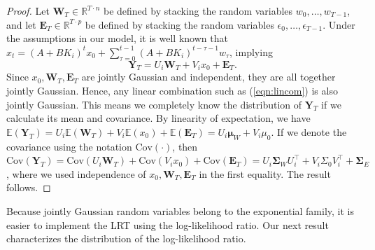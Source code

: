 \documentclass[letterpaper, 10 pt, conference]{ieeeconf}  %
\begin{document}
\begin{proof}
    Let $\mathbf{W}_T \in \mathbb{R}^{T\cdot n}$ be defined by stacking the random variables $w_0,\ldots,w_{T-1}$, and let $\mathbf{E}_T \in \mathbb{R}^{T\cdot p}$ be defined by stacking the random variables $\epsilon_0,\ldots,\epsilon_{T-1}$. Under the assumptions in our model, it is well known that $x_{t} = (A+BK_i)^tx_0 + \sum_{\tau = 0}^{t-1}(A+BK_i)^{t-\tau-1}w_\tau$, implying
    \begin{equation}
        \mathbf{Y}_T = U_i\mathbf{W}_T + V_ix_0 + \mathbf{E}_T.\label{eqn:lincom}
    \end{equation} 
    Since $x_0, \mathbf{W}_T, \mathbf{E}_T$ are jointly Gaussian and independent, they are all together jointly Gaussian. Hence, any linear combination such as (\ref{eqn:lincom}) is also jointly Gaussian. This means we completely know the distribution of $\mathbf{Y}_T$ if we calculate its mean and covariance. By linearity of expectation, we have $\mathbb{E}(\mathbf{Y}_T) = U_i\mathbb{E}(\mathbf{W}_T) + V_i\mathbb{E}(x_0) + \mathbb{E}(\mathbf{E}_T) = 
        U_i\boldsymbol{\mu}_W + V_i\mu_0$. If we denote the covariance using the notation $\textrm{Cov}(\cdot)$, then $\textrm{Cov}(\mathbf{Y}_T) = \textrm{Cov}(U_i\mathbf{W}_T) + \textrm{Cov}(V_ix_0) + \textrm{Cov}(\mathbf{E}_T) = 
        U_i\mathbf{\Sigma}_WU_i^\top + V_i\Sigma_0V_i^\top + \mathbf{\Sigma}_E$, where we used independence of $x_0,\mathbf{W}_T,\mathbf{E}_T$ in the first equality. The result follows.
\end{proof}

Because jointly Gaussian random variables belong to the exponential family, it is easier to implement the LRT using the log-likelihood ratio. Our next result characterizes the distribution of the log-likelihood ratio.
\end{document}
